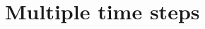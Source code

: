 \documentclass[a4paper,10pt]{report}
\begin{document}
% 
% 
% 
% 
% 
% 
% 
% 
% 
% 
% 
% 

\section{Multiple time steps}
\end{document}
